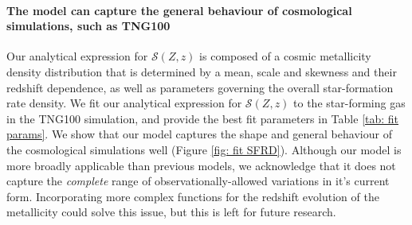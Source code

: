 \documentclass[twocolumn]{aastex631}
\newcommand{\SFRDzZ}{\ensuremath{\mathcal{S}(Z,z)}\xspace}
\begin{document}
\paragraph{The model can capture the general behaviour of cosmological simulations, such as TNG100}
Our analytical expression for \SFRDzZ is composed of a cosmic metallicity density distribution that is determined by a mean, scale and skewness and their redshift dependence, as well as parameters governing the overall star-formation rate density. We fit our analytical expression for \SFRDzZ to the star-forming gas in the TNG100 simulation, and provide the best fit parameters in Table \ref{tab: fit params}. 
We show that our model captures the shape and general behaviour of the cosmological simulations well (Figure \ref{fig: fit SFRD}). 
Although our model is more broadly applicable than previous models, we acknowledge that it does not capture the \textit{complete} range of observationally-allowed variations in it's current form. Incorporating more complex functions for the redshift evolution of the metallicity could solve this issue, but this is left for future research.    
\end{document}
